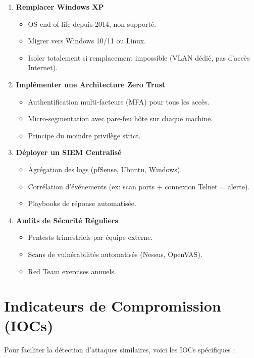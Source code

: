 \documentclass[12pt,a4paper,openany]{report}
\begin{document}
	\begin{enumerate}
		\item \textbf{Remplacer Windows XP}
		\begin{itemize}
			\item OS end-of-life depuis 2014, non supporté.
			\item Migrer vers Windows 10/11 ou Linux.
			\item Isoler totalement si remplacement impossible (VLAN dédié, pas d'accès Internet).
		\end{itemize}
		
		\item \textbf{Implémenter une Architecture Zero Trust}
		\begin{itemize}
			\item Authentification multi-facteurs (MFA) pour tous les accès.
			\item Micro-segmentation avec pare-feu hôte sur chaque machine.
			\item Principe du moindre privilège strict.
		\end{itemize}
		
		\item \textbf{Déployer un SIEM Centralisé}
		\begin{itemize}
			\item Agrégation des logs (pfSense, Ubuntu, Windows).
			\item Corrélation d'événements (ex: scan ports + connexion Telnet = alerte).
			\item Playbooks de réponse automatisée.
		\end{itemize}
		
		\item \textbf{Audits de Sécurité Réguliers}
		\begin{itemize}
			\item Pentests trimestriels par équipe externe.
			\item Scans de vulnérabilités automatisés (Nessus, OpenVAS).
			\item Red Team exercises annuels.
		\end{itemize}
	\end{enumerate}
	
	\section{Indicateurs de Compromission (IOCs)}
	
	Pour faciliter la détection d'attaques similaires, voici les IOCs spécifiques :
	
\end{document}

